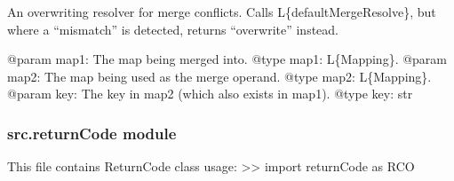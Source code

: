 \documentclass[a4paper,10pt,english]{sphinxmanual}
\begin{document}

\begin{fulllineitems}
\label{commands/apidoc/src:src.pyconf.overwriteMergeResolve}
An overwriting resolver for merge conflicts. Calls L\{defaultMergeResolve\},
but where a ``mismatch'' is detected, returns ``overwrite'' instead.

@param map1: The map being merged into.
@type map1: L\{Mapping\}.
@param map2: The map being used as the merge operand.
@type map2: L\{Mapping\}.
@param key: The key in map2 (which also exists in map1).
@type key: str

\end{fulllineitems}



\subsubsection{src.returnCode module}
\label{commands/apidoc/src:module-src.returnCode}\label{commands/apidoc/src:src-returncode-module}
This file contains ReturnCode class
usage:
\textgreater{}\textgreater{} import returnCode as RCO
\end{document}
